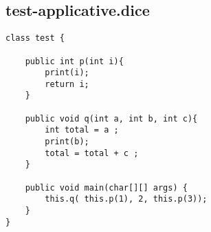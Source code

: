 \subsection{test-applicative.dice}
\begin{verbatim}
class test {
	
	public int p(int i){ 
		print(i); 
		return i; 
	}

	public void q(int a, int b, int c){ 
		int total = a ; 
		print(b); 
		total = total + c ; 
	}
	
	public void main(char[][] args) {
		this.q( this.p(1), 2, this.p(3));
	}
}
\end{verbatim}